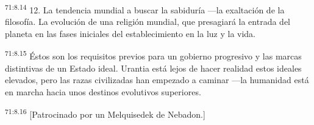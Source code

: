 \par
\textsuperscript{71:8.14} 12. La tendencia mundial a buscar la sabiduría ---la exaltación de la filosofía. La evolución de una religión mundial, que presagiará la entrada del planeta en las fases iniciales del establecimiento en la luz y la vida.

\par
\textsuperscript{71:8.15} Éstos son los requisitos previos para un gobierno progresivo y las marcas distintivas de un Estado ideal. Urantia está lejos de hacer realidad estos ideales elevados, pero las razas civilizadas han empezado a caminar ---la humanidad está en marcha hacia unos destinos evolutivos superiores.

\par
\textsuperscript{71:8.16} [Patrocinado por un Melquisedek de Nebadon.]